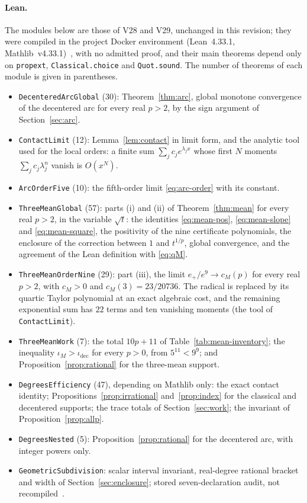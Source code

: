 \paragraph{Lean.}
The modules below are those of V28 and V29, unchanged in this revision; they were compiled in the
project Docker environment (Lean~4.33.1, Mathlib~v4.33.1)~\cite{lean4,mathlib}, with no admitted proof,
and their main theorems depend only on \texttt{propext}, \texttt{Classical.choice} and
\texttt{Quot.sound}. The number of theorems of each module is given in parentheses.
\begin{itemize}
\item \texttt{DecenteredArcGlobal} (30): Theorem~\ref{thm:arc}, global monotone convergence of the
  decentered arc for every real $p>2$, by the sign argument of Section~\ref{sec:arc}.
\item \texttt{ContactLimit} (12): Lemma~\ref{lem:contact} in limit form, and the analytic tool used for
  the local orders: a finite sum $\sum_jc_je^{\lambda_jx}$ whose first $N$ moments
  $\sum_jc_j\lambda_j^{n}$ vanish is $O(x^{N})$.
\item \texttt{ArcOrderFive} (10): the fifth-order limit \eqref{eq:arc-order} with its constant.
\item \texttt{ThreeMeanGlobal} (57): parts (i) and (ii) of Theorem~\ref{thm:mean} for every real $p>2$,
  in the variable $\sqrt t$: the identities \eqref{eq:mean-pos}, \eqref{eq:mean-slope} and
  \eqref{eq:mean-square}, the positivity of the nine certificate polynomials, the enclosure of the
  correction between $1$ and $t^{1/p}$, global convergence, and the agreement of the Lean definition
  with \eqref{eq:qM}.
\item \texttt{ThreeMeanOrderNine} (29): part (iii), the limit $e_+/e^{9}\to c_M(p)$ for every real
  $p>2$, with $c_M>0$ and $c_M(3)=23/20736$. The radical is replaced by its quartic Taylor polynomial at
  an exact algebraic cost, and the remaining exponential sum has $22$ terms and ten vanishing moments
  (the tool of \texttt{ContactLimit}).
\item \texttt{ThreeMeanWork} (7): the total $10p+11$ of Table~\ref{tab:mean-inventory}; the inequality
  $\iota_M>\iota_{\mathrm{dec}}$ for every $p>0$, from $5^{11}<9^{9}$; and
  Proposition~\ref{prop:rational} for the three-mean support.
\item \texttt{DegreesEfficiency} (47), depending on Mathlib only: the exact contact identity;
  Propositions~\ref{prop:irrational} and~\ref{prop:index} for the classical and decentered supports;
  the trace totals of Section~\ref{sec:work}; the invariant of Proposition~\ref{prop:allp}.
\item \texttt{DegreesNested} (5): Proposition~\ref{prop:rational} for the decentered arc, with integer
  powers only.
\item \texttt{GeometricSubdivision}: scalar interval invariant, real-degree rational bracket and width
  of Section~\ref{sec:enclosure}; stored seven-declaration audit, not recompiled~\cite{supplS}.
\end{itemize}
